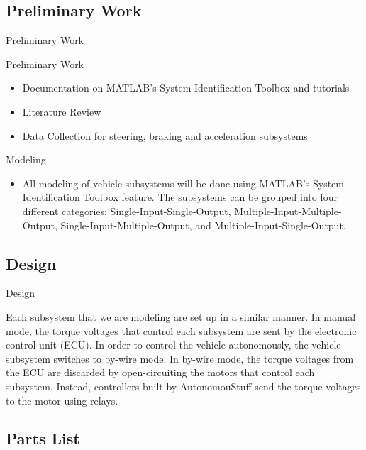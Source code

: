 \documentclass{beamer}
\begin{document}
\subsection{Preliminary Work}

\begin{frame}{Preliminary Work}
  \begin{block}{Preliminary Work}
 \begin{itemize}
        \item Documentation on MATLAB's System Identification Toolbox and tutorials
        \item Literature Review 
        \item Data Collection for steering, braking and acceleration subsystems
\end{itemize}
  \end{block}
  \begin {block}{Modeling}
  \begin{itemize}
  	\item All modeling of vehicle subsystems will be done using MATLAB's System Identification Toolbox feature. The subsystems can be grouped into four different categories: Single-Input-Single-Output, Multiple-Input-Multiple-Output, Single-Input-Multiple-Output, and Multiple-Input-Single-Output. 
  	\end{itemize}
  	\end{block}
\end{frame}

\subsection{Design}

\begin{frame}{Design}
	\begin{block}{}
		Each subsystem that we are modeling are set up in a similar manner. In manual mode, the torque voltages that control each subsystem are sent by the electronic control unit (ECU). In order to control the vehicle autonomously, the vehicle subsystem switches to by-wire mode. In by-wire mode, the torque voltages from the ECU are discarded by open-circuiting the motors that control each subsystem. Instead, controllers built by AutonomouStuff send the torque voltages to the motor using relays.
	\end{block}
\end{frame}

\subsection{Parts List}
\end{document}
